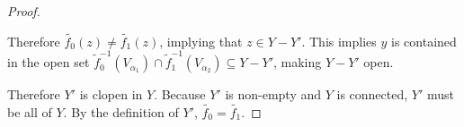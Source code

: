 \documentclass[11pt,reqno]{article}
\theoremstyle{definition}
\begin{document}
\begin{proof}
\begin{itemize}
Therefore $\widetilde{f_0}(z)\ne\widetilde{f_1}(z)$, implying that $z\in Y-Y'$. This implies $y$ is contained in the open set $\widetilde{f}_0^{-1}(V_{\alpha_1})\cap\widetilde{f}_1^{-1}(V_{\alpha_2})\subseteq Y-Y'$, making $Y-Y'$ open. 
\end{itemize}
Therefore $Y'$ is clopen in $Y$. Because $Y'$ is non-empty and $Y$ is connected, $Y'$ must be all of $Y$. By the definition of $Y'$, $\widetilde{f_0}=\widetilde{f_1}$.
\end{proof}
\end{document}
